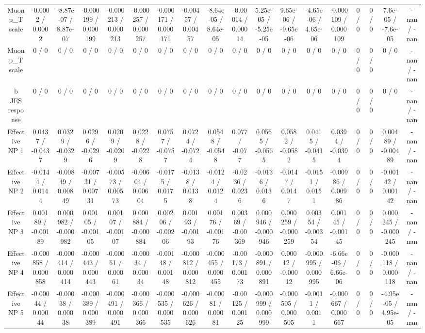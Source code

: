 \documentclass[10pt]{article}
\begin{document}
\begin{table}[htbp]
\begin{center}
\begin{tabular}{|c|c|c|c|c|c|c|c|c|c|c|c|c|c|c|c|c|c|}
  Muon p_{T} scale & -0.0002 / 0.0002 & -8.87e-07 / 8.87e-07 & -0.000199 / 0.000199 & -0.000213 / 0.000213 & -0.000257 / 0.000257 & -0.000171 / 0.000171 & -0.00457 / 0.00457 & -8.64e-05 / 8.64e-05 & -0.00014 / 0.00014 & 5.25e-05 / -5.25e-05 & 9.65e-06 / -9.65e-06 & -4.65e-06 / 4.65e-06 & -0.000109 / 0.000109 & 0 / 0 & 0 / 0 & 7.6e-05 / -7.6e-05 & -nan / -nan \\ 
  Muon p_{T} scale & 0 / 0 & 0 / 0 & 0 / 0 & 0 / 0 & 0 / 0 & 0 / 0 & 0 / 0 & 0 / 0 & 0 / 0 & 0 / 0 & 0 / 0 & 0 / 0 & 0 / 0 & 0 / 0 & 0 / 0 & 0 / 0 & -nan / -nan \\ 
  b JES response & 0 / 0 & 0 / 0 & 0 / 0 & 0 / 0 & 0 / 0 & 0 / 0 & 0 / 0 & 0 / 0 & 0 / 0 & 0 / 0 & 0 / 0 & 0 / 0 & 0 / 0 & 0 / 0 & 0 / 0 & 0 / 0 & -nan / -nan \\ 
  Effective NP 1 & 0.0437 / -0.0437 & 0.0329 / -0.0329 & 0.0296 / -0.0296 & 0.0209 / -0.0209 & 0.0228 / -0.0228 & 0.0757 / -0.0757 & 0.0724 / -0.0724 & 0.0548 / -0.0548 & 0.077 / -0.077 & 0.0565 / -0.0565 & 0.0582 / -0.0582 & 0.0415 / -0.0415 & 0.0394 / -0.0394 & 0 / 0 & 0 / 0 & 0.00489 / -0.00489 & -nan / -nan \\ 
  Effective NP 2 & -0.0144 / 0.0144 & -0.00849 / 0.00849 & -0.00731 / 0.00731 & -0.00573 / 0.00573 & -0.00604 / 0.00604 & -0.0175 / 0.0175 & -0.0138 / 0.0138 & -0.0124 / 0.0124 & -0.0236 / 0.0236 & -0.0136 / 0.0136 & -0.0147 / 0.0147 & -0.0151 / 0.0151 & -0.00986 / 0.00986 & 0 / 0 & 0 / 0 & -0.00142 / 0.00142 & -nan / -nan \\ 
  Effective NP 3 & 0.00189 / -0.00189 & 0.000982 / -0.000982 & 0.00105 / -0.00105 & 0.00107 / -0.00107 & 0.000884 / -0.000884 & 0.00206 / -0.00206 & 0.00193 / -0.00193 & 0.00176 / -0.00176 & 0.00369 / -0.00369 & 0.000946 / -0.000946 & 0.000259 / -0.000259 & 0.00354 / -0.00354 & 0.00145 / -0.00145 & 0 / 0 & 0 / 0 & 0.000245 / -0.000245 & -nan / -nan \\ 
  Effective NP 4 & -0.000858 / 0.000858 & -0.000414 / 0.000414 & -0.000443 / 0.000443 & -0.00061 / 0.00061 & -0.00034 / 0.00034 & -0.00148 / 0.00148 & -0.000812 / 0.000812 & -0.000455 / 0.000455 & -0.00173 / 0.00173 & -0.000891 / 0.000891 & 0.00012 / -0.00012 & -0.000995 / 0.000995 & -6.66e-06 / 6.66e-06 & 0 / 0 & 0 / 0 & -0.000118 / 0.000118 & -nan / -nan \\ 
  Effective NP 5 & -0.00044 / 0.00044 & -0.00038 / 0.00038 & -0.000389 / 0.000389 & -0.000491 / 0.000491 & -0.000366 / 0.000366 & -0.000535 / 0.000535 & -0.000626 / 0.000626 & -0.00081 / 0.00081 & -0.00125 / 0.00125 & -0.000999 / 0.000999 & -0.000505 / 0.000505 & -0.0011 / 0.0011 & -0.000667 / 0.000667 & 0 / 0 & 0 / 0 & -4.95e-05 / 4.95e-05 & -nan / -nan \\ 

\end{tabular}
\end{center}
\end{table}
\end{document}
